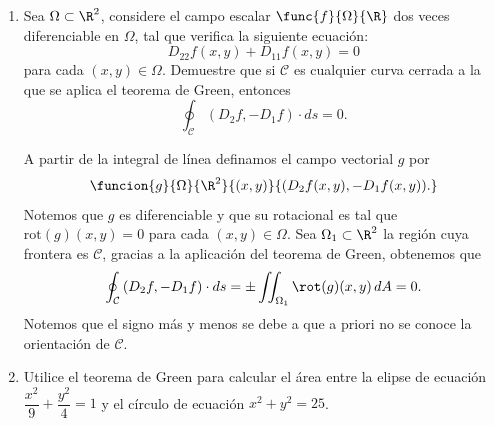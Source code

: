 \documentclass[a4,11pt]{aleph-examen}
\begin{document}
\begin{preguntas}
\begin{respuesta}
\begin{respuesta}
\begin{respuesta}
\begin{enumerate}
\begin{respuesta}
La integral de línea será entonces,

	\[
    \begin{aligned}
    \iint_D \rot \l(f\r) dA &=\int_1^5 \int_{5- \sqrt{4-(x-3)^2}}^{5 + \sqrt{4-(x-3)^2}} \l(x+y\r) dydx\\ 
    &=32 \pi.
    \end{aligned}
    \]
    Se sugiere el cambio de variable
    \[
        \funcion{T}{[0,2]\times[0,2\pi]}{\R^2}{(r,t)}{(r\cos t+3,r\sen t+5 )}
    \]
    donde $J_T(r,t)=r$, entonces
    \[
        \iint_D \rot \l(f\r) dA =\int_0^{2\pi}\int_0^2 (r\cos t + r\sen t +8)rdrdt
    \]
    y verificar que el resultado es $32\pi$.
    
    
\end{respuesta}

\item
    Sea $\Omega\subset\R^{2}$, considere el campo escalar $\func{f}{\Omega}{\R}$ dos veces diferenciable en $\Omega$, tal que verifica la siguiente ecuación:
    \[
        D_{22}f(x, y) + D_{11}f(x, y) =  0
    \]
    para cada $(x, y)\in\Omega$. Demuestre que si $\mathcal{C}$ es cualquier curva cerrada a la que se aplica el teorema de Green, entonces
    \[
        \oint_{\mathcal{C}}{(D_{2}f, - D_{1}f)\cdot ds} = 0.
    \]

\begin{respuesta}\hspace{0pt}

A partir de la integral de línea definamos el campo vectorial $g$ por
\[
    \funcion{g}{\Omega}{\R^{2}}{(x, y)}{(D_{2}f(x, y), - D_{1}f(x, y)).}
\]
Notemos que $g$ es diferenciable y que su rotacional es tal que $\text{rot}(g)(x,y) = 0$ para cada $(x,y)\in\Omega$. Sea $\Omega_{1}\subset\R^{2}$ la región cuya frontera es $\mathcal{C}$, gracias a la aplicación del teorema de Green, obtenemos que
\[
    \oint_{\mathcal{C}}{(D_{2}f, - D_{1}f)\cdot ds} = \pm\iint_{\Omega_{1}}{\rot(g)(x, y)\,dA} = 0.
\]
Notemos que el signo más y menos se debe a que a priori no se conoce la orientación de $\mathcal{C}$.\qedhere    
\end{respuesta}
\item
    Utilice el teorema de Green para calcular el área entre la elipse de ecuación $\dfrac{x^{2}}{9} + \dfrac{y^{2}}{4} = 1$ y el círculo de ecuación $x^{2} + y^{2} = 25$.


\end{enumerate}
\end{respuesta}
\end{respuesta}
\end{respuesta}
\end{preguntas}
\end{document}
